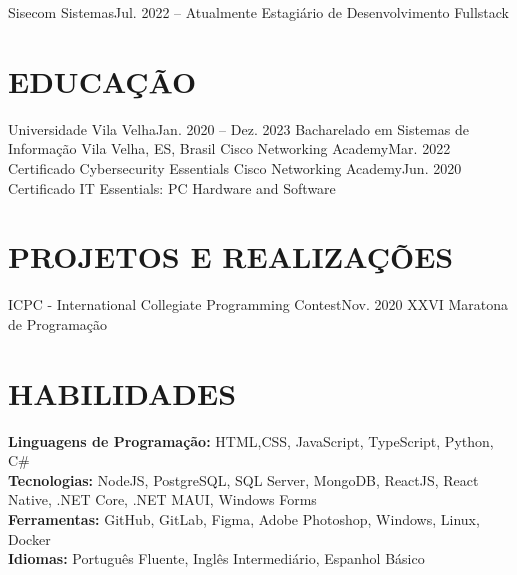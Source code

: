 \resumeSubheading
{Sisecom Sistemas}{Jul. 2022 -- Atualmente}
{Estagiário de Desenvolvimento Fullstack}{}
\resumeItemListStart
{}
\resumeItemListEnd

\resumeSubHeadingListEnd

\section {EDUCAÇÃO}
\resumeSubHeadingListStart
\resumeSubheading
{Universidade Vila Velha}{Jan. 2020 -- Dez. 2023}
{Bacharelado em Sistemas de Informação}
{Vila Velha, ES, Brasil}
\resumeSubHeadingListEnd
\resumeSubHeadingListStart
\resumeSubheading
{Cisco Networking Academy}{Mar. 2022}
{Certificado Cybersecurity Essentials}{}
\resumeSubheading
{Cisco Networking Academy}{Jun. 2020}
{Certificado IT Essentials: PC Hardware and Software}{}
\resumeSubHeadingListEnd

\section{PROJETOS E REALIZAÇÕES}
\resumeSubHeadingListStart
\resumeSubheading
{ICPC - International Collegiate Programming Contest}{Nov. 2020}
{XXVI Maratona de Programação}{}
          
\resumeSubHeadingListEnd

\section{HABILIDADES}
\begin{itemize}[leftmargin=0in, label={}]
	\small{\item{
		\textbf{Linguagens de Programação:}
		{HTML,CSS, JavaScript, TypeScript, Python, C\#}
		\vspace{2pt} \\

    \textbf{Tecnologias:}
		{NodeJS, PostgreSQL, SQL Server, MongoDB, ReactJS, React Native, .NET Core, .NET MAUI, Windows Forms}
		\vspace{2pt} \\
		     
		\textbf{Ferramentas:}
		{GitHub, GitLab, Figma, Adobe Photoshop, Windows, Linux, Docker}
		\vspace{2pt} \\
		     
		\textbf{Idiomas:}
		{Português Fluente, Inglês Intermediário, Espanhol Básico}
	}}
\end{itemize}
